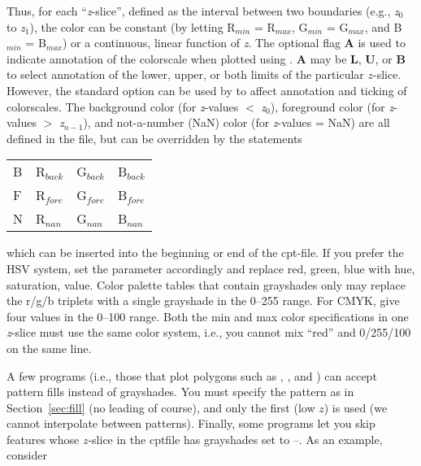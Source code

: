 Thus, for each ``{\it z}-slice'', defined as the interval between two boundaries
(e.g., {\it z$_0$} to {\it z$_1$}), the color can be constant (by letting R$_{min}$
= R$_{max}$, G$_{min}$ = G$_{max}$, and B$_{min}$ = B$_{max}$) or a continuous,
linear function of {\it z}.  The optional flag {\bf A} is used to indicate annotation
of the colorscale when plotted using .  {\bf A} may be {\bf L},
{\bf U}, or {\bf B} to select annotation of the lower, upper, or both limits
of the particular $z$-slice.  However, the standard  option can be used
by  to affect annotation and ticking of colorscales.  The
background color (for {\it z}-values $<$ {\it z$_0$}), foreground color
(for {\it z}-values $>$ {\it z$_{n-1}$}), and not-a-number (NaN) color (for
{\it z}-values = NaN) are all defined in the 
file, but can be overridden by the statements

\begin{center}
\begin{tabular}{llll}
B &  R$_{back}$ &  G$_{back}$ &  B$_{back}$ \\ 
F &  R$_{fore}$ &  G$_{fore}$ &  B$_{fore}$ \\ 
N &  R$_{nan}$ &  G$_{nan}$ &  B$_{nan}$ \\

\end{tabular}
\end{center}

\noindent
which can be inserted into the beginning or end of the cpt-file.  If
you prefer the HSV system, set the
 parameter accordingly and replace red, green,
blue with hue, saturation, value.  Color palette tables that contain
grayshades only may replace the r/g/b triplets with a single grayshade
in the 0--255 range.  For CMYK, give four values in the 0--100 range.
Both the min and max color specifications in one {\it z}-slice must use
the same color system, i.e., you cannot mix ``red'' and 0/255/100 on the
same line.

A few programs (i.e., those that plot polygons such as ,
, and ) can accept pattern fills instead
of grayshades.  You must specify the pattern as in Section~\ref{sec:fill} (no
leading  of course), and only the first (low $z$) is used (we cannot
interpolate between patterns).  
Finally, some programs let you skip features
whose $z$-slice in the cptfile has grayshades set to --.  As an example,
consider

